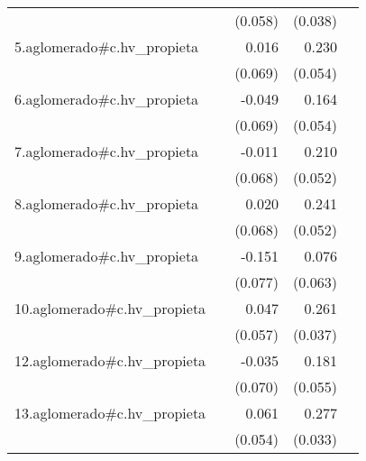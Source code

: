 {\begin{longtable}{l*{4}{D{.}{.}{-1}}}
            &                     &     (0.058)         &     (0.038)         &                     \\
\addlinespace
5.aglomerado#c.hv\_propieta&                     &       0.016         &       0.230\sym{***}&                     \\
            &                     &     (0.069)         &     (0.054)         &                     \\
\addlinespace
6.aglomerado#c.hv\_propieta&                     &      -0.049         &       0.164\sym{**} &                     \\
            &                     &     (0.069)         &     (0.054)         &                     \\
\addlinespace
7.aglomerado#c.hv\_propieta&                     &      -0.011         &       0.210\sym{***}&                     \\
            &                     &     (0.068)         &     (0.052)         &                     \\
\addlinespace
8.aglomerado#c.hv\_propieta&                     &       0.020         &       0.241\sym{***}&                     \\
            &                     &     (0.068)         &     (0.052)         &                     \\
\addlinespace
9.aglomerado#c.hv\_propieta&                     &      -0.151\sym{*}  &       0.076         &                     \\
            &                     &     (0.077)         &     (0.063)         &                     \\
\addlinespace
10.aglomerado#c.hv\_propieta&                     &       0.047         &       0.261\sym{***}&                     \\
            &                     &     (0.057)         &     (0.037)         &                     \\
\addlinespace
12.aglomerado#c.hv\_propieta&                     &      -0.035         &       0.181\sym{***}&                     \\
            &                     &     (0.070)         &     (0.055)         &                     \\
\addlinespace
13.aglomerado#c.hv\_propieta&                     &       0.061         &       0.277\sym{***}&                     \\
            &                     &     (0.054)         &     (0.033)         &                     \\

\end{longtable}}
